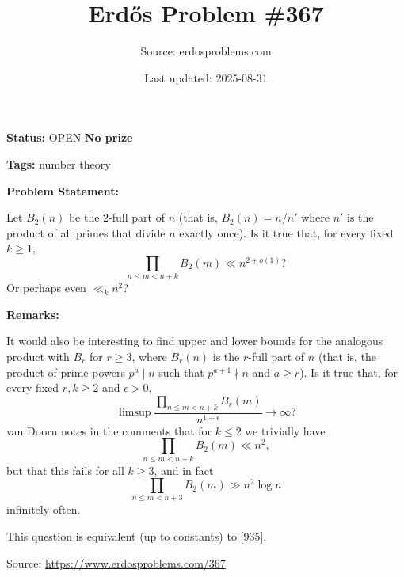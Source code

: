 \documentclass{article}
\title{Erd\H{o}s Problem \#367}
\date{Last updated: 2025-08-31}
\author{Source: erdosproblems.com}
\begin{document}
\maketitle

\noindent\textbf{Status:} OPEN \quad \textbf{No prize}

\noindent\textbf{Tags:} number theory

\medskip
\noindent\textbf{Problem Statement:}

Let $B_2(n)$ be the $2$-full part of $n$ (that is, $B_2(n)=n/n'$ where $n'$ is the product of all primes that divide $n$ exactly once). Is it true that, for every fixed $k\geq 1$,\[\prod_{n\leq m<n+k}B_2(m) \ll n^{2+o(1)}?\]Or perhaps even $\ll_k n^2$?

\bigskip
\noindent\textbf{Remarks:}

It would also be interesting to find upper and lower bounds for the analogous product with $B_r$ for $r\geq 3$, where $B_r(n)$ is the $r$-full part of $n$ (that is, the product of prime powers $p^a \mid n$ such that $p^{a+1}\nmid n$ and $a\geq r$). Is it true that, for every fixed $r,k\geq 2$ and $\epsilon>0$,\[\limsup \frac{\prod_{n\leq m<n+k}B_r(m) }{n^{1+\epsilon}}\to\infty?\]van Doorn notes in the comments that for $k\leq 2$ we trivially have\[\prod_{n\leq m<n+k}B_2(m) \ll n^{2},\]but that this fails for all $k\geq 3$, and in fact\[\prod_{n\leq m<n+3}B_2(m) \gg n^{2}\log n\]infinitely often.

This question is equivalent (up to constants) to [935].

\bigskip
\noindent\small{Source: \url{https://www.erdosproblems.com/367}}
\end{document}

